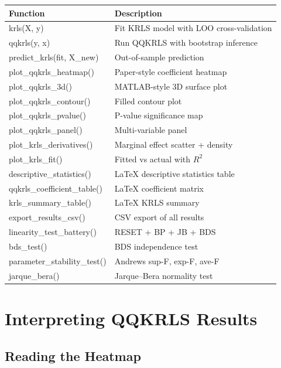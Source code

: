 \begin{center}
\small
\begin{tabular}{>{\ttfamily\color{deepblue}}l p{8cm}}
\toprule
\textbf{Function} & \textbf{Description} \\
\midrule
krls(X, y) & Fit KRLS model with LOO cross-validation \\
qqkrls(y, x) & Run QQKRLS with bootstrap inference \\
predict\_krls(fit, X\_new) & Out-of-sample prediction \\
\midrule
plot\_qqkrls\_heatmap() & Paper-style coefficient heatmap \\
plot\_qqkrls\_3d() & MATLAB-style 3D surface plot \\
plot\_qqkrls\_contour() & Filled contour plot \\
plot\_qqkrls\_pvalue() & P-value significance map \\
plot\_qqkrls\_panel() & Multi-variable panel \\
plot\_krls\_derivatives() & Marginal effect scatter + density \\
plot\_krls\_fit() & Fitted vs actual with $R^2$ \\
\midrule
descriptive\_statistics() & LaTeX descriptive statistics table \\
qqkrls\_coefficient\_table() & LaTeX coefficient matrix \\
krls\_summary\_table() & LaTeX KRLS summary \\
export\_results\_csv() & CSV export of all results \\
\midrule
linearity\_test\_battery() & RESET + BP + JB + BDS \\
bds\_test() & BDS independence test \\
parameter\_stability\_test() & Andrews sup-F, exp-F, ave-F \\
jarque\_bera() & Jarque--Bera normality test \\
\bottomrule
\end{tabular}
\end{center}


\section{Interpreting QQKRLS Results}

\subsection{Reading the Heatmap}

